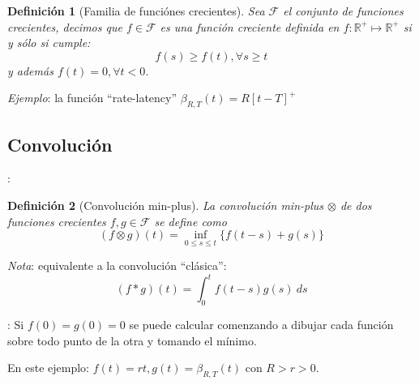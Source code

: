 \documentclass[xcolor={x11names}]{beamer}
\newtheorem{definicion}{Definición}[section]
\begin{document}
\begin{frame}{\secname}
    \begin{definicion}[Familia de funciónes crecientes]
        Sea $\mathcal{F}$ el conjunto 
        de funciones crecientes, decimos
        que $f\in\mathcal{F}$ es una función
        creciente definida en
        $f:\mathbb{R}^+\mapsto\mathbb{R}^+$
        si y sólo si cumple:
        \begin{equation}
            f(s)\geq f(t), \forall s\geq t
        \end{equation}
        y además
        $f(t)=0,\forall t<0$.
    \end{definicion}

    \vfill

    \emph{Ejemplo}: la función ``rate-latency''
    $\beta_{R,T}(t)=R[t-T]^+$



    \begin{figure}[h]
        \centering
        
    \end{figure}

\end{frame}


\subsection{Convolución}
\begin{frame}{\secname: \subsecname}
    \begin{definicion}[Convolución min-plus]
        La convolución
        min-plus
        $\otimes$ de dos
        funciones crecientes
        $f,g\in\mathcal{F}$
        se define como
        \begin{equation}
            (f\otimes g)(t)
            =\inf_{0\leq s\leq t}
            \{f(t-s)+g(s)\}
        \end{equation}
    \end{definicion}

    \vfill

    \emph{Nota}: equivalente
    a la convolución
    ``clásica'':
    \begin{equation*}
        (f\ast g)(t)
        =\int_0^t
        f(t-s)g(s)\ ds
    \end{equation*}
\end{frame}






\begin{frame}{\secname: \subsecname}
    Si $f(0)=g(0)=0$ se puede
    calcular
    comenzando a dibujar
    cada función sobre
    todo punto de la
    otra y tomando
    el mínimo.
    \vfill
    \begin{figure}[h]
        \centering
        
    \end{figure}


    \vfill

    En este ejemplo:
    $f(t)=rt,
    g(t)=\beta_{R,T}(t)$
    con $R>r>0$.
\end{frame}
\end{document}
